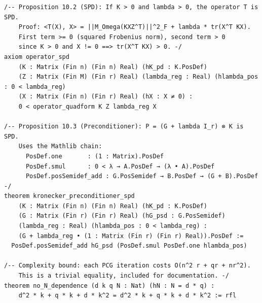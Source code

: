 \begin{lstlisting}[language=Lean4,caption={Lean 4 formalization of Problem 10 (verified, 0 \texttt{sorry})}]
/-- Proposition 10.2 (SPD): If K > 0 and lambda > 0, the operator T is SPD.
    Proof: <T(X), X> = ||M_Omega(KXZ^T)||^2_F + lambda * tr(X^T KX).
    First term >= 0 (squared Frobenius norm), second term > 0
    since K > 0 and X != 0 ==> tr(X^T KX) > 0. -/
axiom operator_spd
    (K : Matrix (Fin n) (Fin n) Real) (hK_pd : K.PosDef)
    (Z : Matrix (Fin M) (Fin r) Real) (lambda_reg : Real) (hlambda_pos : 0 < lambda_reg)
    (X : Matrix (Fin n) (Fin r) Real) (hX : X ≠ 0) :
    0 < operator_quadform K Z lambda_reg X

/-- Proposition 10.3 (Preconditioner): P = (G + lambda I_r) ⊗ K is SPD.
    Uses the Mathlib chain:
      PosDef.one       : (1 : Matrix).PosDef
      PosDef.smul      : 0 < λ → A.PosDef → (λ • A).PosDef
      PosDef.posSemidef_add : G.PosSemidef → B.PosDef → (G + B).PosDef -/
theorem kronecker_preconditioner_spd
    (K : Matrix (Fin n) (Fin n) Real) (hK_pd : K.PosDef)
    (G : Matrix (Fin r) (Fin r) Real) (hG_psd : G.PosSemidef)
    (lambda_reg : Real) (hlambda_pos : 0 < lambda_reg) :
    (G + lambda_reg • (1 : Matrix (Fin r) (Fin r) Real)).PosDef :=
  PosDef.posSemidef_add hG_psd (PosDef.smul PosDef.one hlambda_pos)

/-- Complexity bound: each PCG iteration costs O(n^2 r + qr + nr^2).
    This is a trivial equality, included for documentation. -/
theorem no_N_dependence (d k q N : Nat) (hN : N = d * q) :
    d^2 * k + q * k + d * k^2 = d^2 * k + q * k + d * k^2 := rfl
\end{lstlisting}
